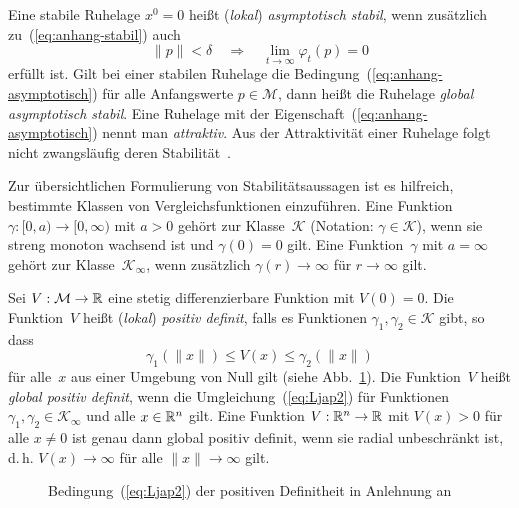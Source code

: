 Eine stabile Ruhelage $x^{0}=0$ heißt (\emph{lokal}) \emph{asymptotisch
stabil}, wenn zusätzlich zu~(\ref{eq:anhang-stabil}) auch 
\begin{equation}
\|p\|<\delta\quad\Longrightarrow\quad\lim_{t\to\infty}\varphi_{t}(p)=0\label{eq:anhang-asymptotisch}
\end{equation}
erfüllt ist. Gilt bei einer stabilen Ruhelage die Bedingung~(\ref{eq:anhang-asymptotisch})
für alle Anfangswerte $p\in\mathcal{M}$, dann heißt die Ruhelage
\emph{global asymptotisch stabil}. Eine Ruhelage mit der Eigenschaft~(\ref{eq:anhang-asymptotisch})
nennt man \emph{attraktiv}. Aus der Attraktivität einer Ruhelage folgt
nicht zwangsläufig deren Stabilität~\cite{vinograd1957,hahn1967}.

Zur übersichtlichen Formulierung von Stabilitätsaussagen ist es hilfreich,
bestimmte Klassen von Vergleichsfunktionen
einzuführen. Eine Funktion $\gamma:[0,a)\to[0,\infty)$ mit $a>0$
gehört zur Klasse~$\mathcal{K}$ (Notation: $\gamma\in\mathcal{K}$),
wenn sie streng monoton wachsend ist und $\gamma(0)=0$ gilt. Eine
Funktion~$\gamma$ mit $a=\infty$ gehört zur Klasse~$\mathcal{K}_{\infty}$,
wenn zusätzlich $\gamma(r)\to\infty$ für $r\to\infty$ gilt.

Sei $V:\mathcal{M}\to{\mathbb{R}}$ eine stetig differenzierbare Funktion mit
$V(0)=0$. Die Funktion~$V$ heißt (\emph{lokal}) \emph{positiv definit},
falls es Funktionen $\gamma_{1},\gamma_{2}\in\mathcal{K}$ gibt, so
dass 
\begin{equation}
\gamma_{1}\left(\|x\|\right)\leq V(x)\leq\gamma_{2}\left(\|x\|\right)\label{eq:Ljap2}
\end{equation}
für alle~$x$ aus einer Umgebung von Null gilt (siehe Abb.~\ref{fig:Positiv-definit}).
Die Funktion~$V$ heißt \emph{global positiv definit}, wenn die Umgleichung~(\ref{eq:Ljap2})
für Funktionen $\gamma_{1},\gamma_{2}\in\mathcal{K}_{\infty}$ und
alle $x\in{\mathbb{R}}^{n}$ gilt. Eine Funktion $V:{\mathbb{R}}^{n}\to{\mathbb{R}}$ mit $V(x)>0$
für alle $x\neq0$ ist genau dann global positiv definit, wenn sie
radial unbeschränkt ist, d.\,h. $V(x)\to\infty$ für alle $\|x\|\to\infty$
gilt.

\begin{figure}
\begin{centering}
\resizebox{0.5\textwidth}{!}{}
\par\end{centering}
\caption{Bedingung~(\ref{eq:Ljap2}) der positiven Definitheit in Anlehnung
an~\cite[Fig.~{4.1}]{slotine1991}\label{fig:Positiv-definit}}

\end{figure}

